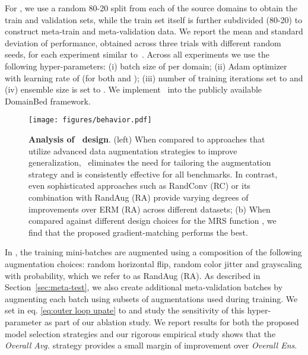 For \muld, we use a random 80-20 split from each of the source domains to obtain the train and validation sets, while the train set itself is further subdivided (80-20) to construct meta-train and meta-validation data. We report the mean and standard deviation of performance, obtained across three trials with different random seeds, for each experiment similar to~\citep{gulrajani2020search}. 
Across all experiments we use the following hyper-parameters: (i) batch size of  per domain; (ii) Adam optimizer~\citep{ADAM} with learning rate of  (for both  and ); (iii) number of training iterations set to  and (iv) ensemble size  is set to . We implement \muld~into the publicly available DomainBed framework.

\begin{figure*}[t]
	\centering
	\texttt{[image: figures/behavior.pdf]}
	\caption{\textbf{Analysis of \muld~design}. (left) When compared to approaches that utilize advanced data augmentation strategies to improve generalization, \muld~eliminates the need for tailoring the augmentation strategy and is consistently effective for all benchmarks. In contrast, even sophisticated approaches such as RandConv (RC) or its combination with RandAug (RA)  provide varying degrees of improvements over ERM (RA) across different datasets; (b) When compared against different design choices for the MRS function , we find that the proposed gradient-matching performs the best.}
	\label{fig:behavior}
\end{figure*}
In \muld, the training mini-batches are augmented using a composition of the following augmentation choices: random horizontal flip, random color jitter and grayscaling with  probability, which we refer to as RandAug (RA). As described in Section~\ref{sec:meta-test}, we also create additional meta-validation batches by augmenting each batch  using subsets of augmentations used during training. We set  in eq. \eqref{eq:outer loop upate} to  and study the sensitivity of this hyper-parameter as part of our ablation study. We report results for both the proposed model selection strategies and our rigorous empirical study shows that the \textit{Overall Avg.} strategy provides a small margin of improvement over \textit{Overall Ens}. 
